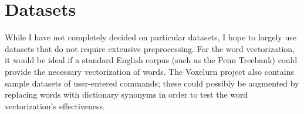 \documentclass[a4paper]{article}
\begin{document}
\section{Datasets}

While I have not completely decided on particular datasets, I hope
to largely use datasets that do not require extensive preprocessing.
For the word vectorization, it would be ideal if a standard English corpus (such as the Penn Treebank) could provide the necessary
vectorization of words. The Voxelurn project also contains sample
datasets of user-entered commands; these could possibly be augmented
by replacing words with dictionary synonyms in order to test the
word vectorization's effectiveness.

{}

\end{document}
